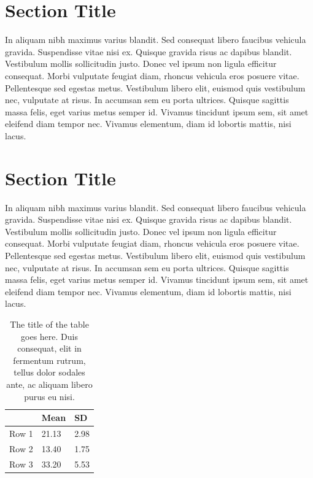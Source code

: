 \documentclass[12pt]{report}
\begin{document}
\section{Section Title}
In aliquam nibh maximus varius blandit. Sed consequat libero faucibus vehicula gravida. Suspendisse vitae nisi ex. Quisque gravida risus ac dapibus blandit. Vestibulum mollis sollicitudin justo. Donec vel ipsum non ligula efficitur consequat. Morbi vulputate feugiat diam, rhoncus vehicula eros posuere vitae. Pellentesque sed egestas metus. Vestibulum libero elit, euismod quis vestibulum nec, vulputate at risus. In accumsan sem eu porta ultrices. Quisque sagittis massa felis, eget varius metus semper id. Vivamus tincidunt ipsum sem, sit amet eleifend diam tempor nec. Vivamus elementum, diam id lobortis mattis, nisi lacus.


\section{Section Title}
In aliquam nibh maximus varius blandit. Sed consequat libero faucibus vehicula gravida. Suspendisse vitae nisi ex. Quisque gravida risus ac dapibus blandit. Vestibulum mollis sollicitudin justo. Donec vel ipsum non ligula efficitur consequat. Morbi vulputate feugiat diam, rhoncus vehicula eros posuere vitae. Pellentesque sed egestas metus. Vestibulum libero elit, euismod quis vestibulum nec, vulputate at risus. In accumsan sem eu porta ultrices. Quisque sagittis massa felis, eget varius metus semper id. Vivamus tincidunt ipsum sem, sit amet eleifend diam tempor nec. Vivamus elementum, diam id lobortis mattis, nisi lacus.


\begin{table}
\caption[The title of the table goes here.]{The title of the table goes here. Duis consequat, elit in fermentum rutrum, tellus dolor sodales ante, ac aliquam libero purus eu nisi.}
\label{tab:table_example2}
\begin{center}
\begin{tabular}{lll}
      & Mean  & SD   \\ \hline
Row 1 & 21.13 & 2.98 \\ 
Row 2 & 13.40 & 1.75 \\ 
Row 3 & 33.20 & 5.53 \\ \hline
\end{tabular}
\end{center}
\end{table}
\end{document}
